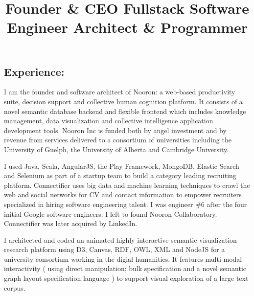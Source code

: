 \documentclass[line,margin]{res}
\begin{document}
\begin{resume}
\pagebreak
\section{Experience:}

\title{ Founder \& CEO }
\begin{position}
  I am the founder and software architect of Nooron:
  a web-based productivity suite, decision support and collective human cognition platform.
  It consists of a novel semantic database backend and flexible frontend which includes knowledge
  management, data visualization and collective intelligence application development tools.
  Nooron Inc is funded both by angel investment and by revenue from services delivered to
  a consortium of universities including the University of Guelph, the University of Alberta
  and Cambridge University.
\end{position}

\title{ Fullstack Software Engineer }
\begin{position}
  I used Java, Scala, AngularJS, the Play Framework, MongoDB, Elastic Search and Selenium
  as part of a startup team to build a category leading recruiting platform.
  Connectifier uses big data and machine learning techniques to crawl the web and social
  networks for CV and contact information to empower recruiters specialized in hiring
  software engineering talent.
  I was engineer \#6 after the four initial Google software engineers.
  I left to found Nooron Collaboratory.
  Connectifier was later acquired by LinkedIn.
\end{position}

\title{ Architect \& Programmer }
\begin{position}
  I architected and coded an animated highly interactive semantic visualization research platform using
  D3, Canvas, RDF, OWL, XML and NodeJS for a university consortium working in the digial humanities.
  It features multi-modal interactivity ( using direct manipulation; bulk specification
  and a novel semantic graph layout specification language ) to support visual exploration of a
  large text corpus.
\end{position}


\end{resume}
\end{document}
